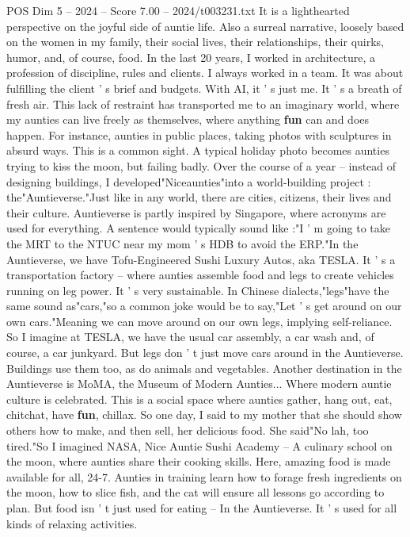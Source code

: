 \begin{textsample}{POS Dim 5 – 2024 – Score 7.00 – 2024/t003231.txt}
It is a lighthearted perspective on the joyful side of auntie life.
Also a surreal narrative, loosely based on the women in my family, their social lives, their relationships, their quirks, humor, and, of course, food.
In the last 20 years, I worked in architecture, a profession of discipline, rules and clients.
I always worked in a team.
It was about fulfilling the client ' s brief and budgets.
With AI, it ' s just me.
It ' s a breath of fresh air.
This lack of restraint has transported me to an imaginary world, where my aunties can live freely as themselves, where anything \textbf{fun} can and does happen.
For instance, aunties in public places, taking photos with sculptures in absurd ways.
This is a common sight.
A typical holiday photo becomes aunties trying to kiss the moon, but failing badly.
Over the course of a year -- instead of designing buildings, I developed"Niceaunties"into a world-building project : the"Auntieverse."Just like in any world, there are cities, citizens, their lives and their culture.
Auntieverse is partly inspired by Singapore, where acronyms are used for everything.
A sentence would typically sound like :"I ' m going to take the MRT to the NTUC near my mom ' s HDB to avoid the ERP."In the Auntieverse, we have Tofu-Engineered Sushi Luxury Autos, aka TESLA.
It ' s a transportation factory -- where aunties assemble food and legs to create vehicles running on leg power.
It ' s very sustainable.
In Chinese dialects,"legs"have the same sound as"cars,"so a common joke would be to say,"Let ' s get around on our own cars."Meaning we can move around on our own legs, implying self-reliance.
So I imagine at TESLA, we have the usual car assembly, a car wash and, of course, a car junkyard.
But legs don ' t just move cars around in the Auntieverse.
Buildings use them too, as do animals and vegetables.
Another destination in the Auntieverse is MoMA, the Museum of Modern Aunties...
Where modern auntie culture is celebrated.
This is a social space where aunties gather, hang out, eat, chitchat, have \textbf{fun}, chillax.
So one day, I said to my mother that she should show others how to make, and then sell, her delicious food.
She said"No lah, too tired."So I imagined NASA, Nice Auntie Sushi Academy -- A culinary school on the moon, where aunties share their cooking skills.
Here, amazing food is made available for all, 24-7.
Aunties in training learn how to forage fresh ingredients on the moon, how to slice fish, and the cat will ensure all lessons go according to plan.
But food isn ' t just used for eating -- In the Auntieverse.
It ' s used for all kinds of relaxing activities.

\end{textsample}
